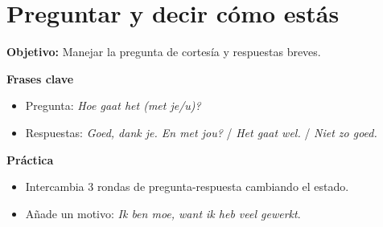 \section{Preguntar y decir cómo estás}
\textbf{Objetivo:} Manejar la pregunta de cortesía y respuestas breves.

\textbf{Frases clave}
\begin{itemize}[leftmargin=*]
  \item Pregunta: \textit{Hoe gaat het (met je/u)?}
  \item Respuestas: \textit{Goed, dank je. En met jou?} / \textit{Het gaat wel.} / \textit{Niet zo goed.}
\end{itemize}

\textbf{Práctica}
\begin{itemize}[leftmargin=*]
  \item Intercambia 3 rondas de pregunta-respuesta cambiando el estado.
  \item Añade un motivo: \textit{Ik ben moe, want ik heb veel gewerkt}.
\end{itemize}
